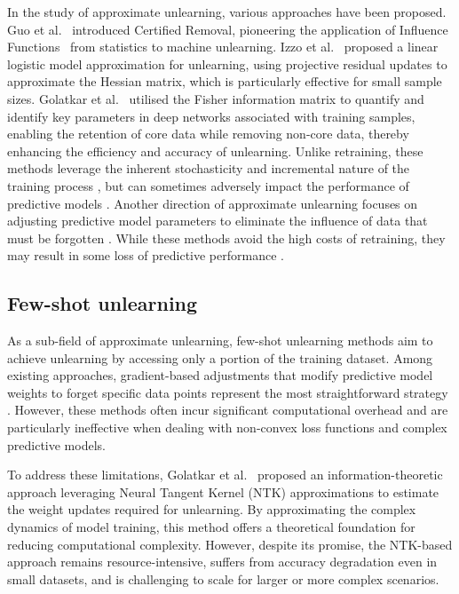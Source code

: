 \documentclass[preprint,12pt]{elsarticle}
\begin{document}
In the study of approximate unlearning, various approaches have been proposed. Guo et al.~\cite{GuoGHM20} introduced Certified Removal, pioneering the application of Influence Functions~\cite{koh2017understanding} from statistics to machine unlearning. Izzo et al.~\cite{izzo2021approximate} proposed a linear logistic model approximation for unlearning, using projective residual updates to approximate the Hessian matrix, which is particularly effective for small sample sizes. Golatkar et al.~\cite{golatkar2021mixed} utilised the Fisher information matrix to quantify and identify key parameters in deep networks associated with training samples, enabling the retention of core data while removing non-core data, thereby enhancing the efficiency and accuracy of unlearning. Unlike retraining, these methods leverage the inherent stochasticity and incremental nature of the training process \cite{parisi2019continual,read2012batch,dohare2024loss}, but can sometimes adversely impact the performance of predictive models \cite{golatkar2020forgetting,chundawat2023can}.
Another direction of approximate unlearning focuses on adjusting predictive model parameters to eliminate the influence of data that must be forgotten \cite{golatkar2020eternal}. While these methods avoid the high costs of retraining, they may result in some loss of predictive performance \cite{golatkar2020forgetting,chundawat2023can}.


\subsection{Few-shot unlearning}
As a sub-field of approximate unlearning, few-shot unlearning methods \cite{peste2021ssse} aim to achieve unlearning by accessing only a portion of the training dataset. Among existing approaches, gradient-based adjustments that modify predictive model weights to forget specific data points represent the most straightforward strategy \cite{golatkar2020eternal}. However, these methods often incur significant computational overhead and are particularly ineffective when dealing with non-convex loss functions and complex predictive models.

To address these limitations, Golatkar et al.~\cite{golatkar2020forgetting} proposed an information-theoretic approach leveraging Neural Tangent Kernel (NTK) approximations to estimate the weight updates required for unlearning. By approximating the complex dynamics of model training, this method offers a theoretical foundation for reducing computational complexity. However, despite its promise, the NTK-based approach remains resource-intensive, suffers from accuracy degradation even in small datasets, and is challenging to scale for larger or more complex scenarios.
\end{document}
